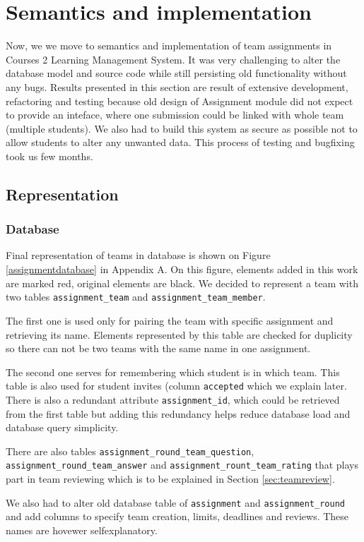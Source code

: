 \section{Semantics and implementation}
Now, we we move to semantics and implementation of team assignments in Courses 2 Learning Management System. It was very challenging to alter the database model and source code while still persisting old functionality without any bugs. Results presented in this section are result of extensive development, refactoring and testing because old design of Assignment module did not expect to provide an inteface, where one submission could be linked with whole team (multiple students). We also had to build this system as secure as possible not to allow students to alter any unwanted data. This process of testing and bugfixing took us few months.

\subsection{Representation}

\subsubsection{Database}
Final representation of teams in database is shown on Figure \ref{assignmentdatabase} in Appendix A. On this figure, elements added in this work are marked red, original elements are black. We decided to represent a team with two tables \texttt{assignment\_team} and \texttt{assignment\_team\_member}.

The first one is used only for pairing the team with specific assignment and retrieving its name. Elements represented by this table are checked for duplicity so there can not be two teams with the same name in one assignment.

The second one serves for remembering which student is in which team. This table is also used for student invites (column \texttt{accepted} which we explain later. There is also a redundant attribute \texttt{assignment\_id}, which could be retrieved from the first table but adding this redundancy helps reduce database load and database query simplicity.

There are also tables \texttt{assignment\_round\_team\_question}, \texttt{assignment\_round\_team\_answer} and \texttt{assignment\_rount\_team\_rating} that plays part in team reviewing which is to be explained in Section \ref{sec:teamreview}.

We also had to alter old database table of \texttt{assignment} and \texttt{assignment\_round} and add columns to specify team creation, limits, deadlines and reviews. These names are hovewer self\-explanatory.

